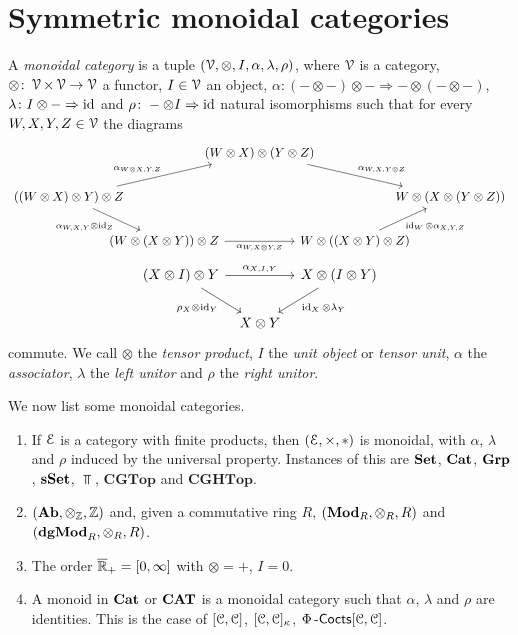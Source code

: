 \documentclass[a4paper,11pt,oneside,openany]{scrbook}
\begin{document}
\section{Symmetric monoidal categories}

\begin{defn}
    A \emph{monoidal category} is a tuple $(\operatorname{\mathcal{V}},\otimes,I,\alpha,\lambda,\rho)$, where $\operatorname{\mathcal{V}}$ is a category, $\otimes\colon\operatorname{\mathcal{V}}\times\operatorname{\mathcal{V}}\rightarrow\operatorname{\mathcal{V}}$ a functor, $I\in\operatorname{\mathcal{V}}$ an object, $\alpha\colon(-\otimes-)\otimes-\Rightarrow-\otimes(-\otimes-)$, $\lambda\colon I\otimes-\Rightarrow\operatorname{id}$ and $\rho\colon-\otimes I\Rightarrow\operatorname{id}$ natural isomorphisms such that for every $W,X,Y,Z\in\operatorname{\mathcal{V}}$ the diagrams
    \[
    \begin{tikzcd}[column sep = -2.0em]
    & & (W \otimes X) \otimes (Y \otimes Z) \arrow[drr, "\alpha_{W, X, Y \otimes Z}"] \\ 
    ((W \otimes X) \otimes Y) \otimes Z \arrow[urr, "\alpha_{W \otimes X, Y, Z}"] \arrow[dr,"\alpha_{W,X,Y} \otimes \id_Z", swap] 
    & & & & W \otimes (X \otimes (Y \otimes Z)) \\
    & (W \otimes (X \otimes Y)) \otimes Z \arrow[rr, "\alpha_{W, X \otimes Y, Z}", swap]
    & & W \otimes ((X \otimes Y) \otimes Z) \arrow[ur, "\id_{W}\otimes\alpha_{X,Y,Z}", swap]
    \end{tikzcd}
    \]
    \[
    \begin{tikzcd}[column sep=tiny]
    (X\otimes I)\otimes Y\ar[rr, "\alpha_{X,I,Y}"]\ar[dr, "\rho_X\otimes\id_Y", swap]
    && X\otimes (I\otimes Y)\ar[dl, "\id_X\otimes\lambda_Y"] \\
    & X\otimes Y
    \end{tikzcd}
    \]
    commute. We call $\otimes$ the \emph{tensor product}, $I$ the \emph{unit object} or \emph{tensor unit}, $\alpha$ the \emph{associator}, $\lambda$ the \emph{left unitor} and $\rho$ the \emph{right unitor}.
\end{defn}

\begin{exmp}
    We now list some monoidal categories.
    \begin{enumerate}
        \item If $\operatorname{\mathcal{E}}$ is a category with finite products, then $(\operatorname{\mathcal{E}},\times,*)$ is monoidal, with $\alpha$, $\lambda$ and $\rho$ induced by the universal property. Instances of this are ${\normalfont\textbf{Set}}$, ${\normalfont\textbf{Cat}}$, ${\normalfont\textbf{Grp}}$, ${\normalfont\textbf{sSet}}$, $\Top$, $\mathbf{CGTop}$ and $\mathbf{CGHTop}$.
        \item $({\normalfont\textbf{Ab}},\otimes_{\operatorname{\mathbb{Z}}},\operatorname{\mathbb{Z}})$ and, given a commutative ring $R$, $({\normalfont\textbf{Mod}}_R,\otimes_R,R)$ and $({\normalfont\textbf{dgMod}}_R,\otimes_R,R)$.
        \item The order $\overline{\operatorname{\mathbb{R}}}_+=[0,\infty]$ with $\otimes=+$, $I=0$.
        \item A monoid in ${\normalfont\textbf{Cat}}$ or ${\normalfont\textbf{CAT}}$ is a monoidal category such that $\alpha$, $\lambda$ and $\rho$ are identities. This is the case of $[\operatorname{\mathcal{C}},\operatorname{\mathcal{C}}]$, $[\operatorname{\mathcal{C}},\operatorname{\mathcal{C}}]_\kappa$, $\Phi\operatorname{-\mathsf{Cocts}}[\operatorname{\mathcal{C}},\operatorname{\mathcal{C}}]$.
    \end{enumerate}
\end{exmp}
\end{document}
